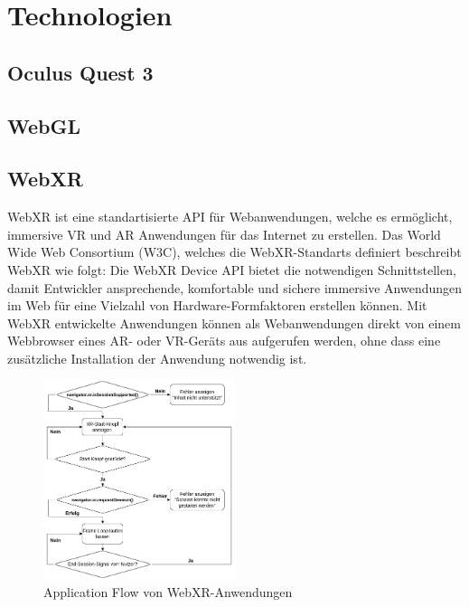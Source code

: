 \chapter{Technologien}

\section{Oculus Quest 3}

\section{WebGL}

\section{WebXR}

WebXR ist eine standartisierte API für Webanwendungen, welche es ermöglicht, immersive VR und AR Anwendungen für das Internet zu erstellen.
Das World Wide Web Consortium (W3C), welches die WebXR-Standarts definiert beschreibt WebXR wie folgt: \glqq{}Die WebXR Device API bietet die notwendigen Schnittstellen, damit Entwickler ansprechende, komfortable und sichere immersive Anwendungen im Web für eine Vielzahl von Hardware-Formfaktoren erstellen können.\grqq{} \autocite[aus dem Englischen mit DeepL ][1. Introduction]{w3c_webxr}
Mit WebXR entwickelte Anwendungen können als Webanwendungen direkt von einem Webbrowser eines AR- oder VR-Geräts aus aufgerufen werden, ohne dass eine zusätzliche Installation der Anwendung notwendig ist.

\begin{figure}[H]
    \centering
    \includegraphics[width=0.5\textwidth]{images/WebXR-App-Flow.png}
    \caption{Application Flow von WebXR-Anwendungen}
    \label{fig:webxr-app-flow}
  \end{figure}

